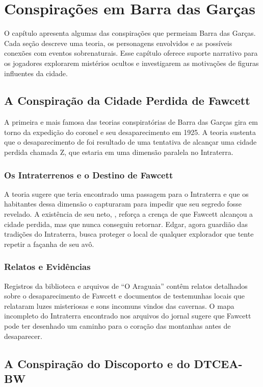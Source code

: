 \chapter{Conspirações em Barra das Garças}

O capítulo apresenta algumas das conspirações que permeiam Barra das Garças. Cada seção descreve uma teoria, os personagens envolvidos e as possíveis conexões com eventos sobrenaturais. Esse capítulo oferece suporte narrativo para os jogadores explorarem mistérios ocultos e investigarem as motivações de figuras influentes da cidade.

\section{A Conspiração da Cidade Perdida de Fawcett}

A primeira e mais famosa das teorias conspiratórias de Barra das Garças gira em torno da expedição do coronel  e seu desaparecimento em 1925. A teoria sustenta que o desaparecimento de  foi resultado de uma tentativa de alcançar uma cidade perdida chamada Z, que estaria em uma dimensão paralela no Intraterra.

\subsection{Os Intraterrenos e o Destino de Fawcett}
A teoria sugere que  teria encontrado uma passagem para o Intraterra e que os habitantes dessa dimensão o capturaram para impedir que seu segredo fosse revelado. A existência de seu neto, , reforça a crença de que Fawcett alcançou a cidade perdida, mas que nunca conseguiu retornar. Edgar, agora guardião das tradições do Intraterra, busca proteger o local de qualquer explorador que tente repetir a façanha de seu avô.

\subsection{Relatos e Evidências}
Registros da biblioteca e arquivos de ``O Araguaia'' contêm relatos detalhados sobre o desaparecimento de Fawcett e documentos de testemunhas locais que relataram luzes misteriosas e sons incomuns vindos das cavernas. O mapa incompleto do Intraterra encontrado nos arquivos do jornal sugere que Fawcett pode ter desenhado um caminho para o coração das montanhas antes de desaparecer.

\section{A Conspiração do Discoporto e do DTCEA-BW}

